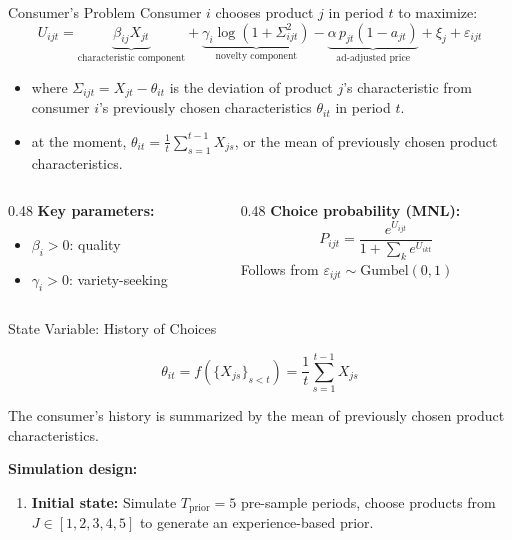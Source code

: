 \documentclass[aspectratio=169,professionalfonts]{beamer}
\newcommand{\hl}[1]{\textbf{\textcolor{UGARed}{#1}}}
\begin{document}
\begin{frame}{Consumer's Problem}
  Consumer $i$ chooses product $j$ in period $t$ to maximize:
  \begin{equation*}
    U_{ijt} = \underbrace{\beta_{ij} X_{jt}}_{\text{characteristic component}}
              + \underbrace{\gamma_i \log(1 + \Sigma_{ijt}^2)}_{\text{novelty component}}
              - \underbrace{\alpha \, p_{jt} (1-a_{jt})}_{\text{ad-adjusted price}}
              + \xi_{j} + \varepsilon_{ijt}
  \end{equation*}
  \begin{itemize}
    \item where $\Sigma_{ijt} = X_{jt} - \theta_{it}$ is the deviation of product $j$'s characteristic from consumer $i$'s previously chosen characteristics $\theta_{it}$ in period $t$.
    \item at the moment, $\theta_{it} = \frac{1}{t}\sum_{s=1}^{t-1} X_{js}$, or the mean of previously chosen product characteristics.
  \end{itemize}
  \vspace{8pt}
  \begin{columns}[T]
    \begin{column}{0.48\textwidth}
      \hl{Key parameters:}
      \begin{itemize}
        \item $\beta_i > 0$: quality
        \item $\gamma_i > 0$: variety-seeking
      \end{itemize}
    \end{column}
    \begin{column}{0.48\textwidth}
      \hl{Choice probability (MNL):}
      \begin{equation*}
        P_{ijt} = \frac{e^{U_{ijt}}}{1 + \sum_{k} e^{U_{ikt}}}
      \end{equation*}
      Follows from $\varepsilon_{ijt} \sim \text{Gumbel}(0,1)$
    \end{column}
  \end{columns}
\end{frame}

\begin{frame}{State Variable: History of Choices}
  \begin{tcolorbox}[colback=red!5!white, colframe=UGARed, title=\textbf{History of Choices $\theta_{it}$}]
    \[
    \theta_{it} = f(\{X_{js}\}_{s < t}) = \frac{1}{t}\sum_{s=1}^{t-1} X_{js}
    \]

    The consumer's history is summarized by the mean of previously chosen product characteristics.
  \end{tcolorbox}

  \vspace{6pt}
  \hl{Simulation design:}
  \begin{enumerate}
    \item \textbf{Initial state:} Simulate $T_{\text{prior}} = 5$ pre-sample
          periods, choose products from $J \in [1,2,3,4,5]$ to generate an experience-based
          prior.
  \end{enumerate}
\end{frame}
\end{document}
